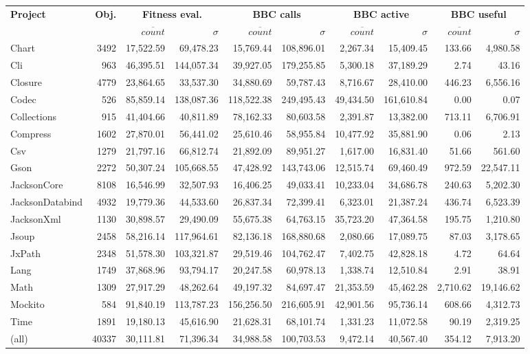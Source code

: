 \begin{tabular}{ l | r | r r | r r | r r | r r }
\textbf{Project} & \textbf{Obj.} & \multicolumn{2}{c|}{\textbf{Fitness eval.}} & \multicolumn{2}{c|}{\textbf{BBC calls}} & \multicolumn{2}{c|}{\textbf{BBC active}} & \multicolumn{2}{c}{\textbf{BBC useful}} \\ 
  &   & $\overline{count}$ & $\sigma$ & $\overline{count}$ & $\sigma$ & $\overline{count}$ & $\sigma$ & $\overline{count}$ & $\sigma$ \\ 
\hline 
Chart & 3492 & 17,522.59 & 69,478.23 & 15,769.44 & 108,896.01 & 2,267.34 & 15,409.45 & 133.66 & 4,980.58 \\ 
Cli & 963 & 46,395.51 & 144,057.34 & 39,927.05 & 179,255.85 & 5,300.18 & 37,189.29 & 2.74 & 43.16 \\ 
Closure & 4779 & 23,864.65 & 33,537.30 & 34,880.69 & 59,787.43 & 8,716.67 & 28,410.00 & 446.23 & 6,556.16 \\ 
Codec & 526 & 85,859.14 & 138,087.36 & 118,522.38 & 249,495.43 & 49,434.50 & 161,610.84 & 0.00 & 0.07 \\ 
Collections & 915 & 41,404.66 & 40,811.89 & 78,162.33 & 80,603.58 & 2,391.87 & 13,382.00 & 713.11 & 6,706.91 \\ 
Compress & 1602 & 27,870.01 & 56,441.02 & 25,610.46 & 58,955.84 & 10,477.92 & 35,881.90 & 0.06 & 2.13 \\ 
Csv & 1279 & 21,797.16 & 66,812.74 & 21,892.09 & 89,951.27 & 1,617.00 & 16,831.40 & 51.66 & 561.60 \\ 
Gson & 2272 & 50,307.24 & 105,668.55 & 47,428.92 & 143,743.06 & 12,515.74 & 69,460.49 & 972.59 & 22,547.11 \\ 
JacksonCore & 8108 & 16,546.99 & 32,507.93 & 16,406.25 & 49,033.41 & 10,233.04 & 34,686.78 & 240.63 & 5,202.30 \\ 
JacksonDatabind & 4932 & 19,779.36 & 44,533.60 & 26,837.34 & 72,399.41 & 6,323.01 & 21,387.24 & 436.74 & 6,523.39 \\ 
JacksonXml & 1130 & 30,898.57 & 29,490.09 & 55,675.38 & 64,763.15 & 35,723.20 & 47,364.58 & 195.75 & 1,210.80 \\ 
Jsoup & 2458 & 58,216.14 & 117,964.61 & 82,136.18 & 168,880.68 & 2,080.66 & 17,089.75 & 87.03 & 3,178.65 \\ 
JxPath & 2348 & 51,578.30 & 103,321.87 & 29,519.46 & 104,762.47 & 7,402.75 & 42,828.18 & 4.72 & 64.64 \\ 
Lang & 1749 & 37,868.96 & 93,794.17 & 20,247.58 & 60,978.13 & 1,338.74 & 12,510.84 & 2.91 & 38.91 \\ 
Math & 1309 & 27,917.29 & 48,262.64 & 49,197.32 & 84,697.47 & 21,353.59 & 45,462.28 & 2,710.62 & 19,146.62 \\ 
Mockito & 584 & 91,840.19 & 113,787.23 & 156,256.50 & 216,605.91 & 42,901.56 & 95,736.14 & 608.66 & 4,312.73 \\ 
Time & 1891 & 19,180.13 & 45,616.90 & 21,628.31 & 68,101.74 & 1,331.23 & 11,072.58 & 90.19 & 2,319.25 \\ 
\hline 
(all) & 40337 & 30,111.81 & 71,396.34 & 34,988.58 & 100,703.53 & 9,472.14 & 40,567.40 & 354.12 & 7,913.20 \\ 
\end{tabular}